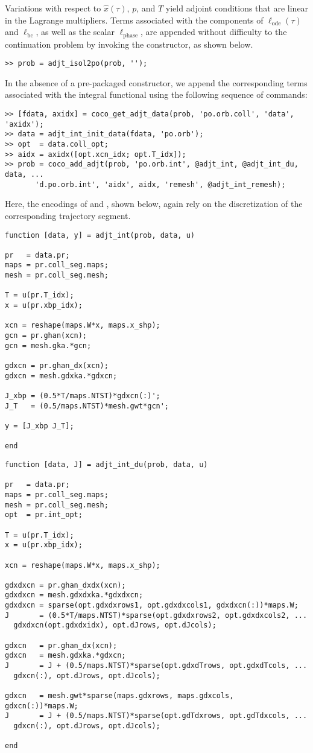 Variations with respect to $\hat{x}(\tau)$, $p$, and $T$ yield adjoint conditions that are linear in the Lagrange multipliers. Terms associated with the components of $\ell_\mathrm{ode}(\tau)$ and $\ell_\mathrm{bc}$, as well as the scalar $\ell_\mathrm{phase}$, are appended without difficulty to the continuation problem by invoking the  constructor, as shown below.
\begin{lstlisting}[language=coco-highlight]
>> prob = adjt_isol2po(prob, '');
\end{lstlisting}
In the absence of a pre-packaged constructor, we append the corresponding terms associated with the integral functional using the following sequence of commands:
\begin{lstlisting}[language=coco-highlight]
>> [fdata, axidx] = coco_get_adjt_data(prob, 'po.orb.coll', 'data', 'axidx');
>> data = adjt_int_init_data(fdata, 'po.orb');
>> opt  = data.coll_opt;
>> aidx = axidx([opt.xcn_idx; opt.T_idx]);
>> prob = coco_add_adjt(prob, 'po.orb.int', @adjt_int, @adjt_int_du, data, ...
       'd.po.orb.int', 'aidx', aidx, 'remesh', @adjt_int_remesh);
\end{lstlisting}
Here, the encodings of  and , shown below, again rely on the discretization of the corresponding trajectory segment.
\begin{lstlisting}[language=coco-highlight]
function [data, y] = adjt_int(prob, data, u)

pr   = data.pr;
maps = pr.coll_seg.maps;
mesh = pr.coll_seg.mesh;

T = u(pr.T_idx);
x = u(pr.xbp_idx);

xcn = reshape(maps.W*x, maps.x_shp);
gcn = pr.ghan(xcn);
gcn = mesh.gka.*gcn;

gdxcn = pr.ghan_dx(xcn);
gdxcn = mesh.gdxka.*gdxcn;

J_xbp = (0.5*T/maps.NTST)*gdxcn(:)';
J_T   = (0.5/maps.NTST)*mesh.gwt*gcn';

y = [J_xbp J_T];

end
\end{lstlisting}
\begin{lstlisting}[language=coco-highlight]
function [data, J] = adjt_int_du(prob, data, u)

pr   = data.pr;
maps = pr.coll_seg.maps;
mesh = pr.coll_seg.mesh;
opt  = pr.int_opt;

T = u(pr.T_idx);
x = u(pr.xbp_idx);

xcn = reshape(maps.W*x, maps.x_shp);

gdxdxcn = pr.ghan_dxdx(xcn);
gdxdxcn = mesh.gdxdxka.*gdxdxcn;
gdxdxcn = sparse(opt.gdxdxrows1, opt.gdxdxcols1, gdxdxcn(:))*maps.W;
J       = (0.5*T/maps.NTST)*sparse(opt.gdxdxrows2, opt.gdxdxcols2, ...
  gdxdxcn(opt.gdxdxidx), opt.dJrows, opt.dJcols);

gdxcn   = pr.ghan_dx(xcn);
gdxcn   = mesh.gdxka.*gdxcn;
J       = J + (0.5/maps.NTST)*sparse(opt.gdxdTrows, opt.gdxdTcols, ...
  gdxcn(:), opt.dJrows, opt.dJcols);

gdxcn   = mesh.gwt*sparse(maps.gdxrows, maps.gdxcols, gdxcn(:))*maps.W;
J       = J + (0.5/maps.NTST)*sparse(opt.gdTdxrows, opt.gdTdxcols, ...
  gdxcn(:), opt.dJrows, opt.dJcols);

end
\end{lstlisting}
